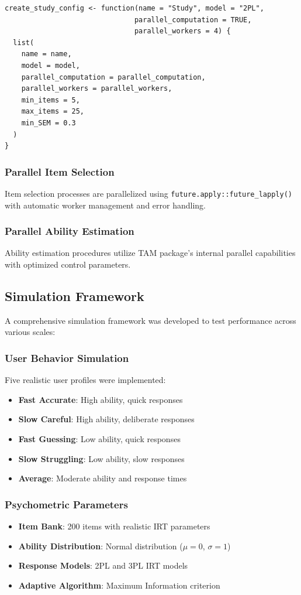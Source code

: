 \documentclass[11pt]{article}
\begin{document}
\begin{verbatim}
create_study_config <- function(name = "Study", model = "2PL", 
                               parallel_computation = TRUE, 
                               parallel_workers = 4) {
  list(
    name = name,
    model = model,
    parallel_computation = parallel_computation,
    parallel_workers = parallel_workers,
    min_items = 5,
    max_items = 25,
    min_SEM = 0.3
  )
}
\end{verbatim}

\subsubsection{Parallel Item Selection}
Item selection processes are parallelized using \texttt{future.apply::future\_lapply()} with automatic worker management and error handling.

\subsubsection{Parallel Ability Estimation}
Ability estimation procedures utilize TAM package's internal parallel capabilities with optimized control parameters.

\subsection{Simulation Framework}

A comprehensive simulation framework was developed to test performance across various scales:

\subsubsection{User Behavior Simulation}
Five realistic user profiles were implemented:
\begin{itemize}
\item \textbf{Fast Accurate}: High ability, quick responses
\item \textbf{Slow Careful}: High ability, deliberate responses  
\item \textbf{Fast Guessing}: Low ability, quick responses
\item \textbf{Slow Struggling}: Low ability, slow responses
\item \textbf{Average}: Moderate ability and response times
\end{itemize}

\subsubsection{Psychometric Parameters}
\begin{itemize}
\item \textbf{Item Bank}: 200 items with realistic IRT parameters
\item \textbf{Ability Distribution}: Normal distribution ($\mu = 0$, $\sigma = 1$)
\item \textbf{Response Models}: 2PL and 3PL IRT models
\item \textbf{Adaptive Algorithm}: Maximum Information criterion
\end{itemize}
\end{document}
